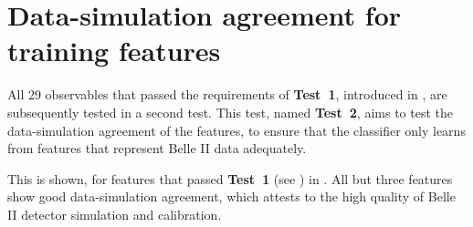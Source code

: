 \chapter{Data-simulation agreement for \texorpdfstring{\BDT}{BDT} training features}\label{sec:appendix_continuum_features_datamc}

All 29 observables that passed the requirements of \textbf{Test~1}, introduced in , are subsequently tested in a second test.
This test, named \textbf{Test~2}, aims to test the data-simulation agreement of the features, to ensure that the classifier only learns from features that represent Belle II data adequately.

This is shown, for features that passed \textbf{Test~1} (see ) in .
All but three features show good data-simulation agreement, which attests to the high quality of Belle II detector simulation and calibration.

